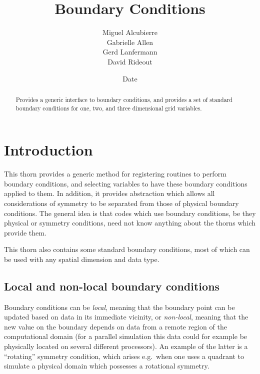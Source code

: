 \documentclass{article}
\begin{document}
\title{Boundary Conditions}
\author{Miguel Alcubierre \\ Gabrielle Allen \\ Gerd Lanfermann \\ David Rideout}
\date{$ $Date$ $}

\maketitle


\begin{abstract}
Provides a generic interface to boundary conditions, and provides a
set of standard boundary conditions for one, two, and three
dimensional grid variables.
\end{abstract}


\section{Introduction}

This thorn provides a generic method for registering routines to perform
boundary conditions, and selecting variables to have these boundary
conditions applied to them.  In addition, it provides abstraction
which allows all considerations of symmetry to be separated from
those of physical boundary conditions.
The general idea is that codes which use boundary conditions, be they
physical or symmetry conditions, need not know anything about the
thorns which provide them.

This thorn also contains some standard boundary conditions, most of which 
can be used with any spatial dimension and data type.

\subsection{Local and non-local boundary conditions}

Boundary conditions can be \emph{local}, meaning that the boundary
point can be updated based on data in its immediate vicinity, or
\emph{non-local}, meaning that the new value on the boundary depends
on data from a remote region of the computational domain (for a parallel 
simulation this data could for example be physically located on several different processors).  An example
of the latter is a ``rotating'' symmetry condition, which arises
e.g.~when one uses a quadrant to simulate a physical domain which
possesses a rotational symmetry.
\end{document}

